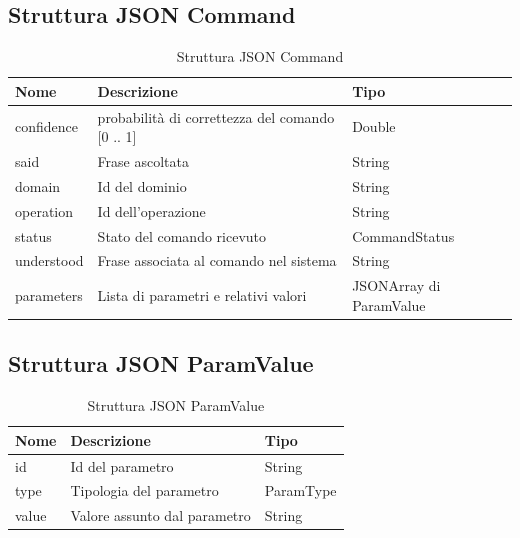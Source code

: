 \documentclass[twoside]{supsistudent}
\begin{document}
\subsection{Struttura JSON Command}
\begin{table}[H]
\centering
\caption{Struttura JSON Command}
\label{Struttura JSON Command}
\begin{tabular}{|l|l|l|}
\hline
Nome            & Descrizione                            & Tipo                        \\ \hline
confidence          & probabilità di correttezza del comando   [0 .. 1]                  & Double                      \\ \hline
said            & Frase ascoltata                        & String                      \\ \hline
domain          & Id del dominio                         & String                      \\ \hline
operation       & Id dell'operazione                     & String                      \\ \hline
status       & Stato del comando ricevuto                    & CommandStatus                      \\ \hline
understood      & Frase associata al comando nel sistema & String                      \\ \hline
parameters & Lista di parametri e relativi valori   & JSONArray di ParamValue \\ \hline
\end{tabular}
\end{table}
\subsection{Struttura JSON ParamValue}
\begin{table}[H]
\centering
\caption{Struttura JSON ParamValue}
\label{Struttura JSON ParamValue}
\begin{tabular}{|l|l|l|}
\hline
Nome  & Descrizione                  & Tipo      \\ \hline
id    & Id del parametro             & String    \\ \hline
type  & Tipologia del parametro      & ParamType \\ \hline
value & Valore assunto dal parametro & String    \\ \hline
\end{tabular}
\end{table}
\end{document}
